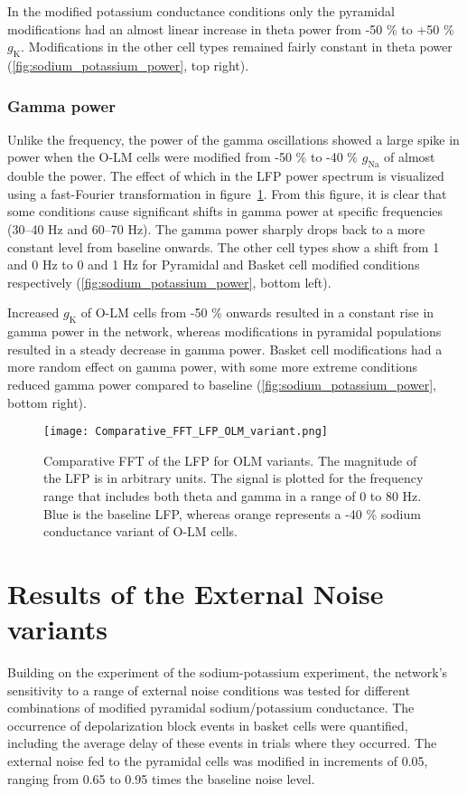In the modified potassium conductance conditions only the pyramidal modifications had an almost linear increase in theta power from -50 \% to +50 \% \(g_{\text{K}}\).
Modifications in the other cell types remained fairly constant in theta power (\ref{fig:sodium_potassium_power}, top right).

\subsubsection{Gamma power}
Unlike the frequency, the power of the gamma oscillations showed a large spike in power when the O-LM cells were modified from -50 \% to -40 \% \(g_{\text{Na}}\) of almost double the power.
The effect of which in the LFP power spectrum is visualized using a fast-Fourier transformation in figure~\ref{fig:comparative_fft_olm_variant}.
From this figure, it is clear that some conditions cause significant shifts in gamma power at specific frequencies (30--40 Hz and 60--70 Hz).
The gamma power sharply drops back to a more constant level from baseline onwards.
The other cell types show a shift from 1 and 0 Hz to 0 and 1 Hz for Pyramidal and Basket cell modified conditions respectively (\ref{fig:sodium_potassium_power}, bottom left).

Increased \(g_{\text{K}}\) of O-LM cells from -50 \% onwards resulted in a constant rise in gamma power in the network, whereas modifications in pyramidal populations resulted in a steady decrease in gamma power.
Basket cell modifications had a more random effect on gamma power, with some more extreme conditions reduced gamma power compared to baseline (\ref{fig:sodium_potassium_power}, bottom right).

\begin{figure}[htbp]
    \centering
    \texttt{[image: Comparative\_FFT\_LFP\_OLM\_variant.png]}
    \caption[Comparative FFT of LFP\@: O-LM variants]{Comparative FFT of the LFP for OLM variants. 
    The magnitude of the LFP is in arbitrary units.
    The signal is plotted for the frequency range that includes both theta and gamma in a range of 0 to 80 Hz.
    Blue is the baseline LFP, whereas orange represents a -40 \% sodium conductance variant of O-LM cells.}\label{fig:comparative_fft_olm_variant}
\end{figure}

\pagebreak

\section{Results of the External Noise variants}
Building on the experiment of the sodium-potassium experiment, the network's sensitivity to a range of external noise conditions was tested for different combinations of modified pyramidal sodium/potassium conductance.
The occurrence of depolarization block events in basket cells were quantified, including the average delay of these events in trials where they occurred.
The external noise fed to the pyramidal cells was modified in increments of 0.05, ranging from 0.65 to 0.95 times the baseline noise level.


